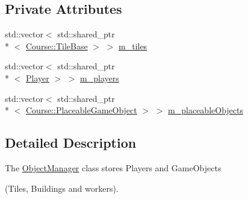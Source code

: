 \subsection*{Private Attributes}
\begin{DoxyCompactItemize}
\item 
std\-::vector$<$ std\-::shared\-\_\-ptr\\*
$<$ \hyperlink{classCourse_1_1TileBase}{Course\-::\-Tile\-Base} $>$ $>$ \hyperlink{classGame_1_1ObjectManager_a814f7a4ef4201c5627c0ae77a4a3dec1}{m\-\_\-tiles}
\item 
std\-::vector$<$ std\-::shared\-\_\-ptr\\*
$<$ \hyperlink{classGame_1_1Player}{Player} $>$ $>$ \hyperlink{classGame_1_1ObjectManager_ae4c88baa0dec114607b47da932b03243}{m\-\_\-players}
\item 
std\-::vector$<$ std\-::shared\-\_\-ptr\\*
$<$ \hyperlink{classCourse_1_1PlaceableGameObject}{Course\-::\-Placeable\-Game\-Object} $>$ $>$ \hyperlink{classGame_1_1ObjectManager_abba2ff9bea647e526ef9a556ebbbcdbe}{m\-\_\-placeable\-Objects}
\end{DoxyCompactItemize}


\subsection{Detailed Description}
The \hyperlink{classGame_1_1ObjectManager}{Object\-Manager} class stores Players and Game\-Objects \par
(Tiles, Buildings and workers). 

